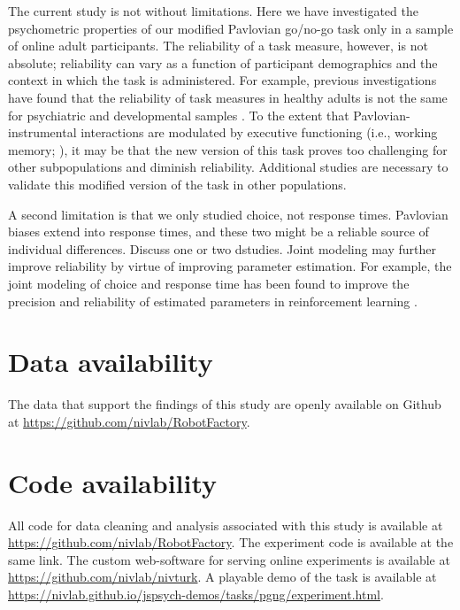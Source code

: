 \documentclass[a4paper,12pt]{article}
\begin{document}
\begin{refsection}[main]
The current study is not without limitations. Here we have investigated the psychometric properties of our modified Pavlovian go/no-go task only in a sample of online adult participants. The reliability of a task measure, however, is not absolute; reliability can vary as a function of participant demographics and the context in which the task is administered. For example, previous investigations have found that the reliability of task measures in healthy adults is not the same for psychiatric and developmental samples \cite{cooper2017role, arnon2020current}. To the extent that Pavlovian-instrumental interactions are modulated by executive functioning (i.e., working memory; \cite{swart2017catecholaminergic, chen2023effect}), it may be that the new version of this task proves too challenging for other subpopulations and diminish reliability. Additional studies are necessary to validate this modified version of the task in other populations. 


A second limitation is that we only studied choice, not response times. Pavlovian biases extend into response times, and these two might be a reliable source of individual differences. Discuss one or two dstudies. Joint modeling may further improve reliability by virtue of improving parameter estimation. For example, the joint modeling of choice and response time has been found to improve the precision and reliability of estimated parameters in reinforcement learning \cite{ballard2019joint, shahar2019improving}.



\break
\section*{Data availability}

The data that support the findings of this study are openly available on Github at \url{https://github.com/nivlab/RobotFactory}.

\section*{Code availability}

All code for data cleaning and analysis associated with this study is available at \url{https://github.com/nivlab/RobotFactory}. The experiment code is available at the same link.  The custom web-software for serving online experiments is available at \url{https://github.com/nivlab/nivturk}. A playable demo of the task is available at \url{https://nivlab.github.io/jspsych-demos/tasks/pgng/experiment.html}.


\end{refsection}
\end{document}
